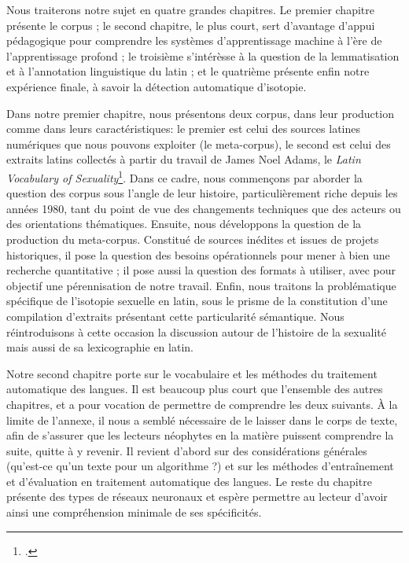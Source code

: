 Nous traiterons notre sujet en quatre grandes chapitres. Le premier chapitre présente le corpus ; le second chapitre, le plus court, sert d'avantage d'appui pédagogique pour comprendre les systèmes d'apprentissage machine à l'ère de l'apprentissage profond ; le troisième s'intérèsse à la question de la lemmatisation et à l'annotation linguistique du latin ; et le quatrième présente enfin notre expérience finale, à savoir la détection automatique d'isotopie.

Dans notre premier chapitre, nous présentons deux corpus, dans leur production comme dans leurs caractéristiques: le premier est celui des sources latines numériques que nous pouvons exploiter (le meta-corpus), le second est celui des extraits latins collectés à partir du travail de James Noel Adams, le \textit{Latin Vocabulary of Sexuality}\footcite{adams}. Dans ce cadre, nous commençons par aborder la question des corpus sous l'angle de leur histoire, particulièrement riche depuis les années 1980, tant du point de vue des changements techniques que des acteurs ou des orientations thématiques. Ensuite, nous développons la question de la production du meta-corpus. Constitué de sources inédites et issues de projets historiques, il pose la question des besoins opérationnels pour mener à bien une recherche quantitative ; il pose aussi la question des formats à utiliser, avec pour objectif une pérennisation de notre travail. Enfin, nous traitons la problématique spécifique de l'isotopie sexuelle en latin, sous le prisme de la constitution d'une compilation d'extraits présentant cette particularité sémantique. Nous réintroduisons à cette occasion la discussion autour de l'histoire de la sexualité mais aussi de sa lexicographie en latin.

Notre second chapitre porte sur le vocabulaire et les méthodes du traitement automatique des langues. Il est beaucoup plus court que l'ensemble des autres chapitres, et a pour vocation de permettre de comprendre les deux suivants. À la limite de l'annexe, il nous a semblé nécessaire de le laisser dans le corps de texte, afin de s'assurer que les lecteurs néophytes en la matière puissent comprendre la suite, quitte à y revenir. Il revient d'abord sur des considérations générales (qu'est-ce qu'un texte pour un algorithme ?) et sur les méthodes d'entraînement et d'évaluation en traitement automatique des langues. Le reste du chapitre présente des types de réseaux neuronaux et espère permettre au lecteur d'avoir ainsi une compréhension minimale de ses spécificités.

